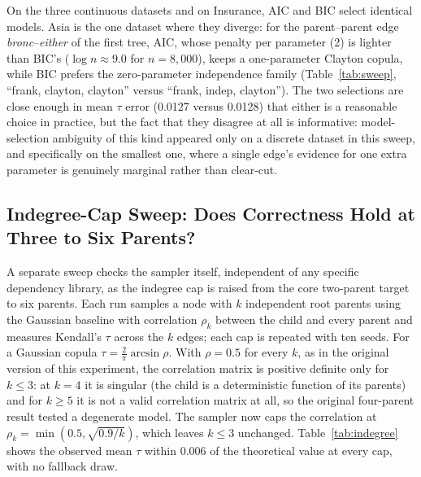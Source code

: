 \documentclass[
  english,
  class=report,
  accentcolor=2c,
  marginpar=false,
  parskip=half-,
  fontsize=11pt,
  ruledheaders=false,
  pdfa=false,
  IMRAD=false,
  thesis={type=master}
]{tudapub}
\begin{document}
On the three continuous datasets and on Insurance, AIC and BIC select
identical models. Asia is the one dataset where they diverge: for the
parent--parent edge \emph{bronc}--\emph{either} of the first tree, AIC,
whose penalty per parameter (2) is lighter than BIC's ($\log n \approx 9.0$
for $n = 8{,}000$), keeps a one-parameter Clayton copula, while BIC prefers
the zero-parameter independence family (Table~\ref{tab:sweep}, ``frank,
clayton, clayton'' versus ``frank, indep, clayton''). The two selections are close enough in mean $\tau$ error
(0.0127 versus 0.0128) that either is a reasonable choice in practice, but
the fact that they disagree at all is informative: model-selection
ambiguity of this kind appeared only on a discrete dataset in this sweep,
and specifically on the smallest one, where a single edge's evidence for
one extra parameter is genuinely marginal rather than clear-cut.

\subsection{Indegree-Cap Sweep: Does Correctness Hold at Three to Six Parents?}
A separate sweep checks the sampler itself, independent of any specific
dependency library, as the indegree cap is raised from the core two-parent
target to six parents. Each run samples a node with $k$ independent root
parents using the Gaussian baseline with correlation $\rho_k$ between the
child and every parent and measures Kendall's $\tau$ across the $k$ edges;
each cap is repeated with ten seeds. For a Gaussian copula $\tau =
\frac{2}{\pi}\arcsin\rho$. With $\rho = 0.5$ for every $k$, as in the
original version of this experiment, the correlation matrix is positive
definite only for $k \le 3$: at $k = 4$ it is singular (the child is a
deterministic function of its parents) and for $k \ge 5$ it is not a valid
correlation matrix at all, so the original four-parent result tested a
degenerate model. The sampler now caps the correlation at $\rho_k =
\min(0.5, \sqrt{0.9/k})$, which leaves $k \le 3$ unchanged.
Table~\ref{tab:indegree} shows the observed mean $\tau$ within 0.006 of the
theoretical value at every cap, with no fallback draw.
\end{document}

